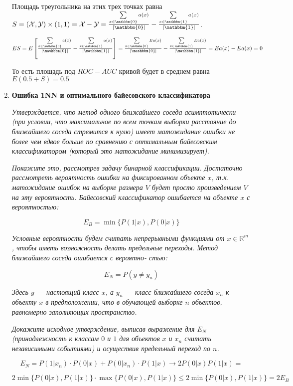 \documentclass[]{book}
\theoremstyle{definition}
\begin{document}
\begin{enumerate}
Площадь треугольника на этих трех точках равна $S = (\mathcal{X}, \mathcal{Y}) \times (1, 1) = \mathcal{X} - \mathcal{Y} = \frac{\sum\limits_{x \in \mathbbm{0}} a(x)}{|\mathbbm{0}|} - \frac{\sum\limits_{x \in \mathbbm{1}} a(x)}{|\mathbbm{1}|}$.

$ES = E \left [ \frac{\sum\limits_{x \in \mathbbm{0}} a(x)}{|\mathbbm{0}|} - \frac{\sum\limits_{x \in \mathbbm{1}} a(x)}{|\mathbbm{1}|} \right ] = \frac{\sum\limits_{x \in \mathbbm{0}} E a(x)}{|\mathbbm{0}|} - \frac{\sum\limits_{x \in \mathbbm{1}} E a(x)}{|\mathbbm{1}|} = E a(x) - E a(x) = 0$

То есть площадь под $ROC-AUC$ кривой будет в среднем равна $E(0.5 + S) = 0.5$

\item\label{4.3} \textbf{Ошибка 1NN и оптимального байесовского классификатора}

\textit{Утверждается, что метод одного ближайшего соседа асимптотически (при условии, что максимальное по всем точкам выборки расстояние до ближайшего соседа стремится к нулю) имеет
матожидание ошибки не более чем вдвое больше по сравнению с оптимальным байесовским
классификатором (который это матожидание минимизирует).}

\textit{Покажите это, рассмотрев задачу бинарной классификации. Достаточно рассмотреть вероятность ошибки на фиксированном объекте $x$, т.к. матожидание ошибок на выборке размера $V$ будет просто произведением $V$ на эту вероятность. Байесовский классификатор ошибается на объекте $x$ с вероятностью:}

$$E_B = \min\{P(1|x), P(0|x)\}$$

\textit{Условные вероятности будем считать непрерывными функциями от $x \in \mathbb{R}^m$   , чтобы иметь возможность делать предельные переходы. Метод ближайшего соседа ошибается с вероятно-
стью:}

$$E_N = P(y \ne y_n)$$

\textit{Здесь $y$  --- настоящий класс $x$, а $y_n$ --- класс ближайшего соседа $x_n$ к объекту $x$ в предположении, что в обучающей выборке $n$ объектов, равномерно заполняющих пространство.}

\textit{Докажите исходное утверждение, выписав выражение для $E_N$ (принадлежность к классам
$0$ и $1$ для объектов $x$ и $x_n$ считать независимыми событиями) и осуществив предельный
переход по $n$.}

$$E_N = P(1|x_n) \cdot P(0|x) + P(0|x_n) \cdot P(1|x) \to 2P(0|x)P(1|x) = $$

$$2\min \{P(0|x), P(1|x)\} \cdot \max \{P(0|x), P(1|x)\} \leqslant 2\min \{P(0|x), P(1|x)\} = 2E_B$$

\end{enumerate}
\end{document}
